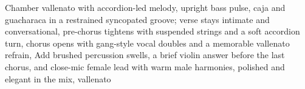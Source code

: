 
\label{sec:una-locura}
\begin{notes}
\end{notes}
\begin{style}
Chamber vallenato with accordion-led melody, upright bass pulse, caja and guacharaca in a restrained syncopated groove; verse stays intimate and conversational, pre-chorus tightens with suspended strings and a soft accordion turn, chorus opens with gang-style vocal doubles and a memorable vallenato refrain, Add brushed percussion swells, a brief violin answer before the last chorus, and close-mic female lead with warm male harmonies, polished and elegant in the mix, vallenato
\end{style}
